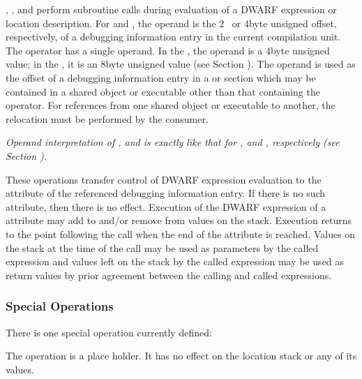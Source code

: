 \begin{enumerate}[1. ]
\itembfnl{\DWOPcalltwoTARG, \DWOPcallfourTARG, \DWOPcallrefTARG}
\DWOPcalltwoINDX, 
\DWOPcallfourINDX, 
and \DWOPcallrefINDX{} perform
subroutine calls during evaluation of a DWARF expression or
location description. 
For \DWOPcalltwoINDX{} and \DWOPcallfour{}, 
the operand is the 2\dash~ or 4\dash byte unsigned offset, respectively,
of a debugging information entry in the current compilation
unit. The \DWOPcallref{} operator has a single operand. In the
\thirtytwobitdwarfformat,
the operand is a 4\dash byte unsigned value;
in the \sixtyfourbitdwarfformat, it is an 8\dash byte unsigned value
(see Section ). 
The operand is used as the offset of a
debugging information entry in a 
\dotdebuginfo{}
or
\dotdebugtypes{}
section which may be contained in a shared object or executable
other than that containing the operator. For references from
one shared object or executable to another, the relocation
must be performed by the consumer.  

\textit{Operand interpretation of
\DWOPcalltwo, \DWOPcallfour{} and \DWOPcallref{} is exactly like
that for \DWFORMreftwo, \DWFORMreffour{} and \DWFORMrefaddr,
respectively  
(see Section  ).  
}

These operations transfer
control of DWARF expression evaluation to 
the 
\DWATlocation{}
attribute of the referenced debugging information entry. If
there is no such attribute, then there is no effect. Execution
of the DWARF expression of 
a 
\DWATlocation{} attribute may add
to and/or remove from values on the stack. Execution returns
to the point following the call when the end of the attribute
is reached. Values on the stack at the time of the call may be
used as parameters by the called expression and values left on
the stack by the called expression may be used as return values
by prior agreement between the calling and called expressions.
\end{enumerate}

\subsubsection{Special Operations}
There 
is one special operation currently defined:
\begin{enumerate}[1. ]
\itembfnl{\DWOPnopTARG}
The \DWOPnopTARG{} operation is a place holder. It has no effect
on the location stack or any of its values.
\end{enumerate}

